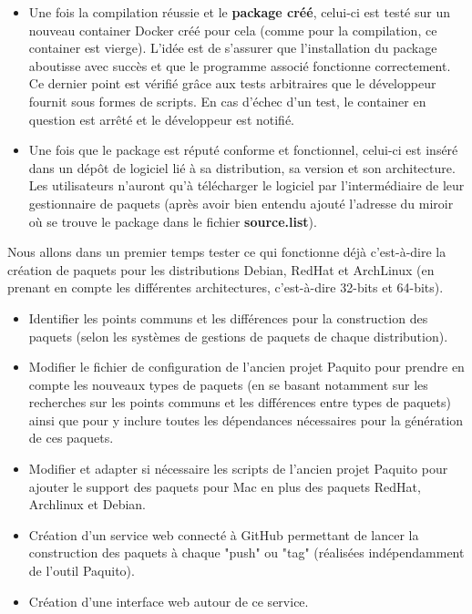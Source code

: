 \documentclass[12pt,a4paper]{article}
\begin{document}
\begin{itemize}
		\item Une fois la compilation réussie et le \textbf{package créé}, celui-ci est testé sur un nouveau container Docker créé pour cela (comme pour la compilation, ce container est vierge). L'idée est de s'assurer que l'installation du package aboutisse avec succès et que le programme associé fonctionne correctement. Ce dernier point est vérifié grâce aux tests arbitraires que le développeur fournit sous formes de scripts. En cas d'échec d'un test, le container en question est arrêté et le développeur est notifié.
		
		\item Une fois que le package est réputé conforme et fonctionnel, celui-ci est inséré dans un dépôt de logiciel lié à sa distribution, sa version et son architecture. Les utilisateurs n'auront qu'à télécharger le logiciel par l'intermédiaire de leur gestionnaire de paquets (après avoir bien entendu ajouté l'adresse du miroir où se trouve le package dans le fichier \textbf{source.list}).
	\end{itemize}
	
	Nous allons dans un premier temps tester ce qui fonctionne déjà c'est-à-dire la création de paquets pour les distributions Debian, RedHat et ArchLinux (en prenant en compte les différentes architectures, c'est-à-dire 32-bits et 64-bits).
	\begin{itemize}\renewcommand{\labelitemi}{$\bullet$}
		\item Identifier les points communs et les différences pour la construction des paquets (selon les systèmes de gestions de paquets de chaque distribution).
		\item Modifier le fichier de configuration de l'ancien projet Paquito pour prendre en compte les nouveaux types de paquets (en se basant notamment sur les recherches sur les points communs et les différences entre types de paquets) ainsi que pour y inclure toutes les dépendances nécessaires pour la génération de ces paquets.
		\item Modifier et adapter si nécessaire les scripts de l'ancien projet Paquito pour ajouter le support des paquets pour Mac en plus des paquets RedHat, Archlinux et Debian.
		\item Création d'un service web connecté à GitHub permettant de lancer la construction des paquets à chaque "push" ou "tag" (réalisées indé\-pendamment de l'outil Paquito).
		\item Création d'une interface web autour de ce service.	
	\end{itemize}
	
\end{document}
